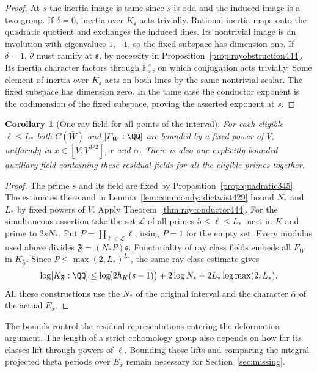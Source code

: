 \documentclass[a4paper,11pt]{article}
\newtheorem{corollary}[proposition]{Corollary}
\theoremstyle{definition}
\theoremstyle{remark}
\numberwithin{equation}{section}
\begin{document}
\begin{proof}
At \(s\) the inertia image is tame since \(s\) is odd and the
induced image is a two-group. If \(\delta=0\), inertia over
\(K_{\mathfrak s}\) acts trivially. Rational inertia maps onto
the quadratic quotient and exchanges the induced lines. Its
nontrivial image is an involution with eigenvalues \(1,-1\),
so the fixed subspace has dimension one. If \(\delta=1\),
\(\theta\) must ramify at \(\mathfrak s\), by necessity in
Proposition~\ref{prop:rayobstruction444}. Its inertia character
factors through \(\mathbb F_s^\times\), on which conjugation
acts trivially. Some element of inertia over \(K_{\mathfrak s}\)
acts on both lines by the same nontrivial scalar. The fixed
subspace has dimension zero. In the tame case the conductor
exponent is the codimension of the fixed subspace, proving
the asserted exponent at \(s\).
\end{proof}

\begin{corollary}[One ray field for all points of the interval]\leavevmode
\label{cor:rayinterval444}
For each eligible \(\ell\le L_*\) both \(C(\bar W)\) and
\([F_{\bar W}:\QQ]\) are bounded by a fixed power of \(V\),
uniformly in \(x\in[V,V^{3/2}]\), \(r\) and \(\alpha\). There
is also one explicitly bounded auxiliary field containing these
residual fields for all the eligible primes together.
\end{corollary}
\begin{proof}
The prime \(s\) and its field are fixed by
Proposition~\ref{prop:quadratic345}. The estimates there and in
Lemma~\ref{lem:commondyadictwist429} bound \(N_*\) and \(L_*\)
by fixed powers of \(V\). Apply Theorem~\ref{thm:rayconductor444}.
For the simultaneous assertion take the set \(\mathcal L\) of all
primes \(5\le\ell\le L_*\) inert in \(K\) and prime to \(2sN_*\).
Put \(P=\prod_{\ell\in\mathcal L}\ell\), using \(P=1\) for
the empty set. Every modulus used above divides
\(\mathfrak F=(N_*P)\mathfrak s\). Functoriality of ray
class fields embeds all \(F_{\bar W}\) in \(K_{\mathfrak F}\).
Since \(P\le \max(2,L_*)^{L_*}\), the same ray class estimate gives
\[
  \log[K_{\mathfrak F}:\QQ]\le
    \log\!\bigl(2h_K(s-1)\bigr)+2\log N_*
                    +2L_*\log\max(2,L_*) .
\]
All these constructions use the \(N_*\) of the original interval
and the character \(\bar\alpha\) of the actual \(E_x\).
\end{proof}

The bounds control the residual representations entering the
deformation argument. The length of a strict cohomology group
also depends on how far its classes lift through powers of
\(\ell\). Bounding those lifts and comparing the integral
projected theta periods over \(E_x\) remain necessary for
Section~\ref{sec:missing}.
\end{document}
